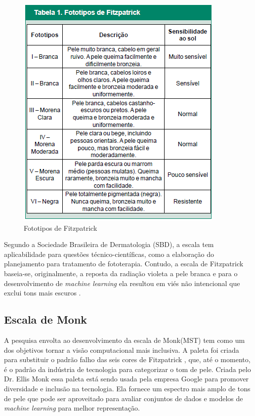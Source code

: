 \begin{figure}[h]
\caption{Fototipos de Fitzpatrick}
\centering

\includegraphics[]{Template_Latex_TCC-UNIFTEC/_lib/imagens/fototipo.png}

\label{fig:x fototipo_fitzpatrick}
\end{figure}

Segundo a Sociedade Brasileira de Dermatologia (SBD)\cite{Classificacao-dos-fototipos-de-pele-SBD}, a escala tem aplicabilidade para questões técnico-científicas, como a elaboração do planejamento para tratamento de fototerapia. Contudo, a escala de Fitzpatrick baseia-se, originalmente, a reposta da radiação violeta a pele branca\cite{Classificao_de_fototipos_de_pele} e para o desenvolvimento de \textit{machine learning} ela resultou em viés não intencional que exclui tons mais escuros \cite{Monk_2019}.
 

\subsection{Escala de Monk}
A pesquisa envolta ao desenvolvimento da escala de Monk(MST) tem como um dos objetivos tornar a visão computacional mais inclusiva. A paleta foi criada para substituir o padrão falho das seis cores de Fitzpatrick \cite{Monk_2019}, que, até o momento, é o padrão da indústria de tecnologia para categorizar o tom de pele. Criada pelo Dr. Ellis Monk essa paleta está sendo usada pela empresa Google para promover diversidade e inclusão na tecnologia. Ela fornece um espectro mais amplo de tons de pele que pode ser aproveitado para avaliar conjuntos de dados e modelos de \textit{machine learning} para melhor representação.

